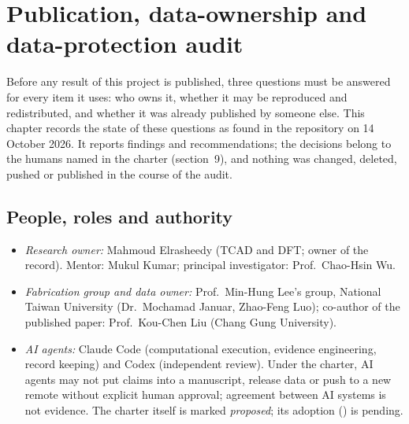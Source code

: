 \chapter{Publication, data-ownership and data-protection audit}
\label{ch:mono-audit}

Before any result of this project is published, three questions must be answered for every item it uses: who owns it,
whether it may be reproduced and redistributed, and whether it was already published by someone else. This chapter
records the state of these questions as found in the repository on 14 October 2026. It reports findings and
recommendations; the decisions belong to the humans named in the charter (section~9), and nothing was changed, deleted,
pushed or published in the course of the audit.

\section{People, roles and authority}
\label{sec:mono-audit-people}

\begin{itemize}
\item \emph{Research owner:} Mahmoud Elrasheedy (TCAD and DFT; owner of the record). Mentor: Mukul Kumar; principal
investigator: Prof.\ Chao-Hsin Wu.
\item \emph{Fabrication group and data owner:} Prof.\ Min-Hung Lee's group, National Taiwan University (Dr.\ Mochamad
Januar, Zhao-Feng Luo); co-author of the published paper: Prof.\ Kou-Chen Liu (Chang Gung University).
\item \emph{AI agents:} Claude Code (computational execution, evidence engineering, record keeping) and Codex
(independent review). Under the charter, AI agents may not put claims into a manuscript, release data or push to a new
remote without explicit human approval; agreement between AI systems is not evidence. The charter itself is marked
\emph{proposed}; its adoption () is pending.
\end{itemize}


